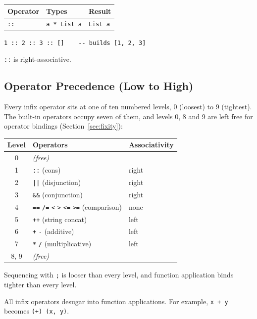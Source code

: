 \documentclass[11pt,a4paper]{article}
\begin{document}
\begin{center}
\begin{tabular}{lll}
\toprule
\textbf{Operator} & \textbf{Types} & \textbf{Result} \\
\midrule
\texttt{::} & \texttt{a * List a} & \texttt{List a} \\
\bottomrule
\end{tabular}
\end{center}

\begin{lstlisting}
1 :: 2 :: 3 :: []    -- builds [1, 2, 3]
\end{lstlisting}

\texttt{::} is right-associative.

\subsection{Operator Precedence (Low to High)}

Every infix operator sits at one of ten numbered levels, 0 (loosest) to 9
(tightest).  The built-in operators occupy seven of them, and levels 0, 8 and
9 are left free for operator bindings
(Section~\ref{sec:fixity}):

\begin{center}
\begin{tabular}{cll}
\toprule
\textbf{Level} & \textbf{Operators} & \textbf{Associativity} \\
\midrule
0 & \emph{(free)}   & \\
1 & \texttt{::} (cons) & right \\
2 & \texttt{||} (disjunction) & right \\
3 & \texttt{\&\&} (conjunction) & right \\
4 & \texttt{==} \texttt{/=} \texttt{<} \texttt{>} \texttt{<=} \texttt{>=}
    (comparison) & none \\
5 & \texttt{++} (string concat) & left \\
6 & \texttt{+} \texttt{-} (additive) & left \\
7 & \texttt{*} \texttt{/} (multiplicative) & left \\
8, 9 & \emph{(free)} & \\
\bottomrule
\end{tabular}
\end{center}

Sequencing with \texttt{;} is looser than every level, and function
application binds tighter than every level.

All infix operators desugar into function applications.  For example,
\texttt{x + y} becomes \texttt{(+) (x, y)}.
\end{document}
